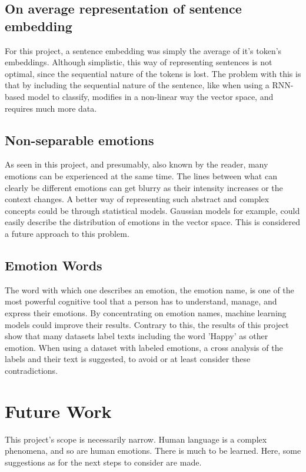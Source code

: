 \subsection{On average representation of sentence embedding}
For this project, a sentence embedding was simply the average of it's token's embeddings. Although simplistic, this way of representing sentences is not optimal, since the sequential nature of the tokens is lost. The problem with this is that by including the sequential nature of the sentence, like when using a RNN-based model to classify, modifies in a non-linear way the vector space, and requires much more data.

\subsection{Non-separable emotions}
As seen in this project, and presumably, also known by the reader, many emotions can be experienced at the same time. The lines between what can clearly be different emotions can get blurry as their intensity increases or the context changes. A better way of representing such abstract and complex concepts could be through statistical models. Gaussian models for example, could easily describe the distribution of emotions in the vector space. This is considered a future approach to this problem.

\subsection{Emotion Words}
The word with which one describes an emotion, the emotion name, is one of the most powerful cognitive tool that a person has to understand, manage, and express their emotions. By concentrating on emotion names, machine learning models could improve their results. Contrary to this, the results of this project show that many datasets label texts including the word 'Happy' as other emotion. When using a dataset with labeled emotions, a cross analysis of the labels and their text is suggested, to avoid or at least consider these contradictions.


\section{Future Work}\label{sec:Future Work}
This project's scope is necessarily narrow. Human language is a complex phenomena, and so are human emotions. There is much to be learned. Here, some suggestions as for the next steps to consider are made.

